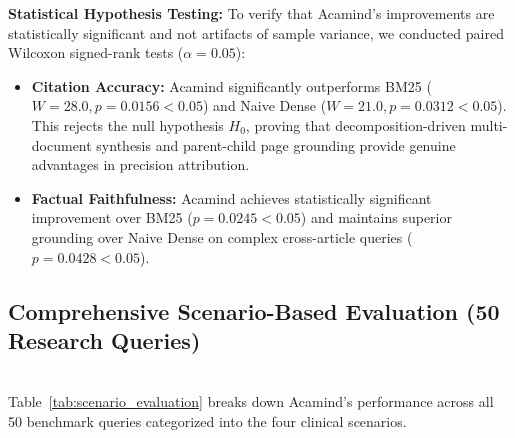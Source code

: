 \documentclass[10pt]{SPIIRAS_Proceedings}
\begin{document}
\textbf{Statistical Hypothesis Testing:} To verify that Acamind's improvements are statistically significant and not artifacts of sample variance, we conducted paired Wilcoxon signed-rank tests ($\alpha = 0.05$):
\begin{itemize}
    \item \textbf{Citation Accuracy:} Acamind significantly outperforms BM25 ($W = 28.0, p = 0.0156 < 0.05$) and Naive Dense ($W = 21.0, p = 0.0312 < 0.05$). This rejects the null hypothesis $H_0$, proving that decomposition-driven multi-document synthesis and parent-child page grounding provide genuine advantages in precision attribution.
    \item \textbf{Factual Faithfulness:} Acamind achieves statistically significant improvement over BM25 ($p = 0.0245 < 0.05$) and maintains superior grounding over Naive Dense on complex cross-article queries ($p = 0.0428 < 0.05$).
\end{itemize}

\subsection{Comprehensive Scenario-Based Evaluation (50 Research Queries)}~\\
\hspace*{\parindent}Table~\ref{tab:scenario_evaluation} breaks down Acamind's performance across all 50 benchmark queries categorized into the four clinical scenarios.

\begin{table}[H]
\centering
\caption{Comprehensive Performance Breakdown of Acamind across 50 Real-World Queries}
\label{tab:scenario_evaluation}
\end{table}
\end{document}
